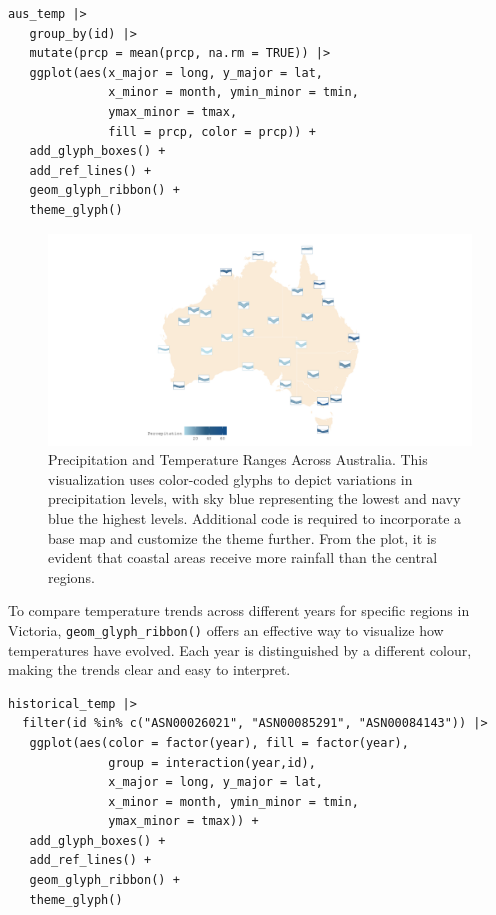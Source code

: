 \begin{verbatim}
aus_temp |>
   group_by(id) |>
   mutate(prcp = mean(prcp, na.rm = TRUE)) |>
   ggplot(aes(x_major = long, y_major = lat,
              x_minor = month, ymin_minor = tmin,
              ymax_minor = tmax, 
              fill = prcp, color = prcp)) +
   add_glyph_boxes() +
   add_ref_lines() +
   geom_glyph_ribbon() +
   theme_glyph()
\end{verbatim}

\begin{figure}

{\centering \includegraphics[width=1\linewidth]{figures/prcp_temp} 

}

\caption{Precipitation and Temperature Ranges Across Australia. This visualization uses color-coded glyphs to depict variations in precipitation levels, with sky blue representing the lowest and navy blue the highest levels. Additional code is required to incorporate a base map and customize the theme further. From the plot, it is evident that coastal areas receive more rainfall than the central regions.}\label{fig:unnamed-chunk-11}
\end{figure}

To compare temperature trends across different years for specific regions in Victoria, \texttt{geom\_glyph\_ribbon()} offers an effective way to visualize how temperatures have evolved. Each year is distinguished by a different colour, making the trends clear and easy to interpret.

\begin{verbatim}
historical_temp |> 
  filter(id %in% c("ASN00026021", "ASN00085291", "ASN00084143")) |>
   ggplot(aes(color = factor(year), fill = factor(year),
              group = interaction(year,id),
              x_major = long, y_major = lat,
              x_minor = month, ymin_minor = tmin, 
              ymax_minor = tmax)) +
   add_glyph_boxes() +
   add_ref_lines() +
   geom_glyph_ribbon() +
   theme_glyph()
\end{verbatim}

